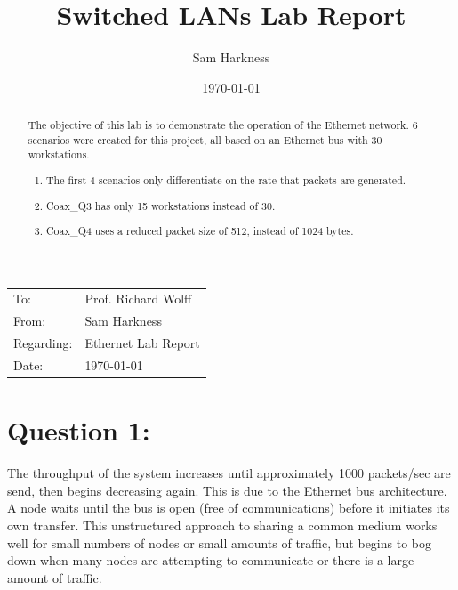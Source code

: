\documentclass[letter,12pt]{article}
\title{Switched LANs Lab Report}
\author{Sam Harkness}
\date{\mydate\today}
\begin{document}

\begin{flushleft}
	\begin{tabular}{l l}
		To: & Prof. Richard Wolff \\
		From: & Sam Harkness \\
		Regarding: & Ethernet Lab Report \\
		Date: & \mydate\today
	\end{tabular}
\end{flushleft}



\begin{abstract}
	The objective of this lab is to demonstrate the operation of the Ethernet network. 6 scenarios were created for this project, all based on an Ethernet bus with 30 workstations.
	\begin{enumerate}
		\item The first 4 scenarios only differentiate on the rate that packets are generated.
		\item Coax\_Q3 has only 15 workstations instead of 30.
		\item Coax\_Q4 uses a reduced packet size of 512, instead of 1024 bytes.
	\end{enumerate}
\end{abstract}

\section{Question 1:}
	The throughput of the system increases until approximately 1000 packets/sec are send, then begins decreasing again.  This is due to the Ethernet bus architecture.  A node waits until the bus is open (free of communications) before it initiates its own transfer.  This unstructured approach to sharing a common medium works well for small numbers of nodes or small amounts of traffic, but begins to bog down when many nodes are attempting to communicate or there is a large amount of traffic.
\end{document}
